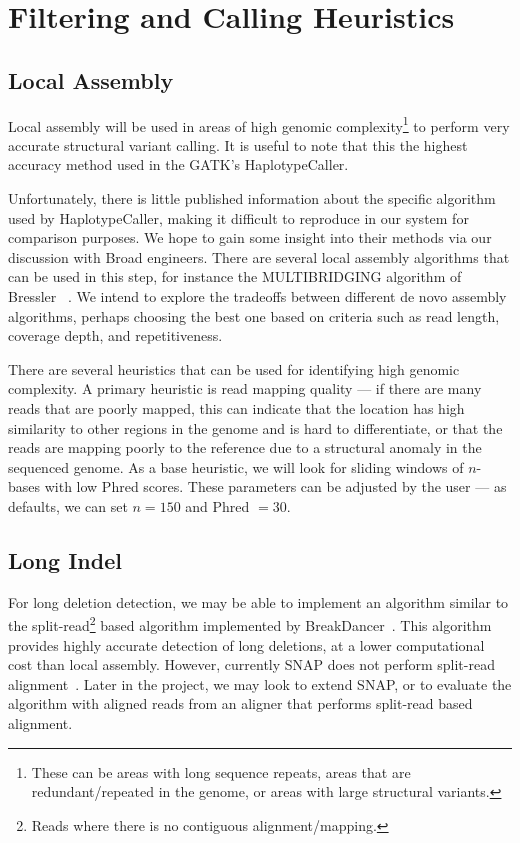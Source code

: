 \documentclass[11pt]{article}
\begin{document}
\section{Filtering and Calling Heuristics}
\label{sec:filtering-calling}

\subsection{Local Assembly}
\label{sec:local-assembly}

Local assembly will be used in areas of high genomic complexity\footnote{These can be areas with long sequence
repeats, areas that are redundant/repeated in the genome, or areas with large structural variants.} to perform very accurate
structural variant calling. It is useful to note that this the highest accuracy method used in the GATK's HaplotypeCaller.

Unfortunately, there is little published information about the specific algorithm used by HaplotypeCaller, making it difficult to
reproduce in our system for comparison purposes. We hope to gain some insight into their methods via our discussion with
Broad engineers. There are several local assembly algorithms that can be used in this step, for instance the MULTIBRIDGING
algorithm of Bressler ~\cite{bresler13}. We intend to explore the tradeoffs between different de novo assembly algorithms, 
perhaps choosing the best one based on criteria such as read length, coverage depth, and repetitiveness.

There are several heuristics that can be used for identifying high genomic complexity. A primary heuristic is read mapping
quality --- if there are many reads that are poorly mapped, this can indicate that the location has high similarity to other
regions in the genome and is hard to differentiate, or that the reads are mapping poorly to the reference due to a structural
anomaly in the sequenced genome. As a base heuristic, we will look for sliding windows of $n$-bases with low Phred scores.
These parameters can be adjusted by the user --- as defaults, we can set $n = 150$ and Phred $= 30$.

\subsection{Long Indel}
\label{sec:long-indel}

For long deletion detection, we may be able to implement an algorithm similar to the split-read\footnote{Reads where
there is no contiguous alignment/mapping.} based algorithm implemented by BreakDancer~\cite{chen09}. This
algorithm provides highly accurate detection of long deletions, at a lower computational cost than local assembly.
However, currently SNAP does not perform split-read alignment~\cite{zaharia11}. Later in the project, we may
look to extend SNAP, or to evaluate the algorithm with aligned reads from an aligner that performs split-read based
alignment.
\end{document}
